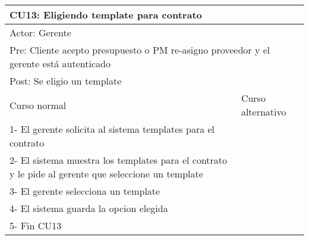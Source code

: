 \begin{table}[H]
  \begin{adjustbox}{max width = \textwidth}
  \begin{tabular}{|l|l|}
    \hline
    \multicolumn{2}{|l|}{CU13: Eligiendo template para contrato} \\\hline
    \multicolumn{2}{|l|}{Actor: Gerente} \\\hline
    \multicolumn{2}{|l|}{Pre: Cliente acepto presupuesto o PM re-asigno proveedor y el gerente está autenticado} \\\hline
    \multicolumn{2}{|l|}{Post: Se eligio un template} \\\hline
     Curso normal & Curso alternativo\\ \hline
     1- El gerente solicita al sistema templates para el contrato & \\ \hline
     2- El sistema muestra los templates para el contrato y le pide al gerente que seleccione un template & \\ \hline
     3- El gerente selecciona un template & \\ \hline
	 4- El sistema guarda la opcion elegida & \\ \hline
     5- Fin CU13 & \\ \hline
  \end{tabular}
  \end{adjustbox}
\end{table}


